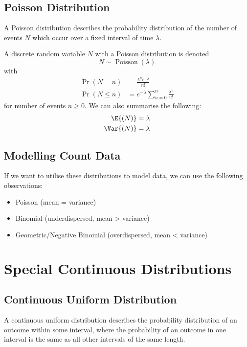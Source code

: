 \documentclass{article}
\begin{document}
\subsection{Poisson Distribution}
A Poisson distribution describes the probability distribution of the number of events \(N\) which occur over a fixed interval of time \(\lambda\).

A discrete random variable \(N\) with a Poisson distribution is denoted
\begin{equation*}
    N \sim \operatorname{Poisson}{\left( \lambda \right)}
\end{equation*}
with
\begin{align*}
    \Pr{\left( N = n \right)}    & = \frac{\lambda^n e^{-\lambda}}{n!}                \\
    \Pr{\left( N \leq n \right)} & = e^{-\lambda} \sum_{u = 0}^n \frac{\lambda^u}{u!}
\end{align*}
for number of events \(n \geq 0\).
We can also summarise the following:
\begin{align*}
    \E{\left( N \right)}   & = \lambda \\
    \Var{\left( N \right)} & = \lambda
\end{align*}
\subsection{Modelling Count Data}
If we want to utilise these distributions to model data, we can use the following observations:
\begin{itemize}
    \item Poisson (mean = variance)
    \item Binomial (underdispersed, mean > variance)
    \item Geometric/Negative Binomial (overdispersed, mean < variance)
\end{itemize}
\section{Special Continuous Distributions}
\subsection{Continuous Uniform Distribution}
A continuous uniform distribution describes the probability distribution of an outcome within some
interval, where the probability of an outcome in one interval is the same as all other intervals of the same length.
\end{document}
